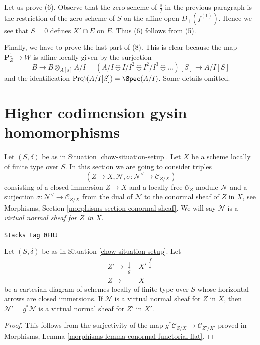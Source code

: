\medskip\noindent
Let us prove (6). Observe that the zero scheme of $\frac{s}{f}$
in the previous paragraph is the restriction of the zero scheme of $S$
on the affine open $D_+(f^{(1)})$. Hence we see that $S = 0$ defines
$X' \cap E$ on $E$. Thus (6) follows from (5).

\medskip\noindent
Finally, we have to prove the last part of (8). This is clear
because the map $\mathbf{P}^1_Z \to W$ is affine locally
given by the surjection
$$
B \to B \otimes_{A[s]} A/I =
(A/I \oplus I/I^2 \oplus I^2/I^3 \oplus \ldots)[S] \to
A/I[S]
$$
and the identification $\text{Proj}(A/I[S]) = \Spec(A/I)$.
Some details omitted.

\section{Higher codimension gysin homomorphisms}
\label{chow-section-gysin-higher-codimension}
Let $(S, \delta)$ be as in Situation \ref{chow-situation-setup}. Let $X$ be a scheme
locally of finite type over $S$. In this section we are going to consider
triples
$$
(Z \to X, \mathcal{N}, \sigma : \mathcal{N}^\vee \to \mathcal{C}_{Z/X})
$$
consisting of a closed immersion $Z \to X$ and a locally free
$\mathcal{O}_Z$-module $\mathcal{N}$ and a surjection
$\sigma : \mathcal{N}^\vee \to \mathcal{C}_{Z/X}$ from the dual
of $\mathcal{N}$ to the conormal sheaf of $Z$ in $X$, see
Morphisms, Section \ref{morphisms-section-conormal-sheaf}.
We will say
$\mathcal{N}$ is a {\it virtual normal sheaf for $Z$ in $X$}.

\begin{lemma}
\label{chow-lemma-pullback-virtual-normal-sheaf}
\href{https://stacks.math.columbia.edu/tag/0FBJ}{\texttt{Stacks tag 0FBJ}}

Let $(S, \delta)$ be as in Situation \ref{chow-situation-setup}. Let
$$
\begin{array}{cc}Z' \longrightarrow\underset{g}{\downarrow} & X' \overset{f}{\downarrow} \\ Z \longrightarrow & X\end{array}
$$
be a cartesian diagram of schemes locally of finite type over $S$
whose horizontal arrows are closed immersions.
If $\mathcal{N}$ is a virtual normal sheaf for $Z$ in $X$, then
$\mathcal{N}' = g^*\mathcal{N}$ is a virtual normal sheaf for
$Z'$ in $X'$.
\end{lemma}

\begin{proof}
This follows from the surjectivity of the map
$g^*\mathcal{C}_{Z/X} \to \mathcal{C}_{Z'/X'}$ proved in
Morphisms, Lemma \ref{morphisms-lemma-conormal-functorial-flat}.
\end{proof}

